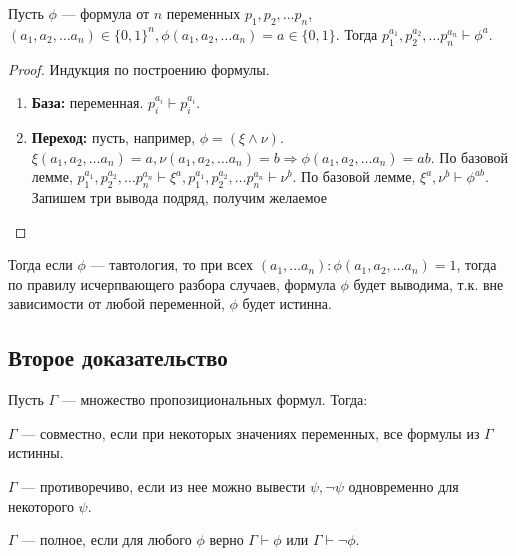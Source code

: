 \begin{lemma}
    Пусть $\phi$ --- формула от $n$ переменных $p_1, p_2, \dots p_n$, $(a_1, a_2, \dots a_n) \in \{0, 1\}^n, \phi(a_1, a_2, \dots a_n) = a \in \{0, 1\}$. Тогда $p_1^{a_1}, p_2^{a_2}, \dots p_n^{a_n} \vdash \phi^a$.
\end{lemma}
\begin{proof}
    Индукция по построению формулы.
    \begin{enumerate}
        \item[] \textbf{База:} переменная. $p_i^{a_i} \vdash p_i^{a_i}$.
        \item[] \textbf{Переход:} пусть, например, $\phi = (\xi \wedge \nu)$. $\xi(a_1, a_2, \dots a_n) = a, \nu(a_1, a_2, \dots a_n) = b \Rightarrow \phi(a_1, a_2, \dots a_n) = ab$. По базовой лемме, $p_1^{a_1}, p_2^{a_2}, \dots p_n^{a_n} \vdash \xi^a, p_1^{a_1}, p_2^{a_2}, \dots p_n^{a_n} \vdash \nu^b$. По базовой лемме, $\xi^a, \nu^b \vdash \phi^{ab}$. Запишем три вывода подряд, получим желаемое
    \end{enumerate}
\end{proof}

Тогда если $\phi$ --- тавтология, то при всех $(a_1, \dots a_n): \phi(a_1, a_2, \dots a_n) = 1$, тогда по правилу исчерпвающего разбора случаев, формула $\phi$ будет выводима, т.к. вне зависимости от любой переменной, $\phi$ будет истинна.

\subsection{Второе доказательство}
Пусть $\Gamma$ --- множество пропозициональных формул. Тогда:

\begin{definition}
    $\Gamma$ --- совместно, если при некоторых значениях переменных, все формулы из $\Gamma$ истинны.
\end{definition}

\begin{definition}
    $\Gamma$ --- противоречиво, если из нее можно вывести $\psi, \neg \psi$ одновременно для некоторого $\psi$.
\end{definition}

\begin{definition}
    $\Gamma$ --- полное, если для любого $\phi$ верно $\Gamma \vdash \phi$ или $\Gamma \vdash \neg \phi$.
\end{definition}

